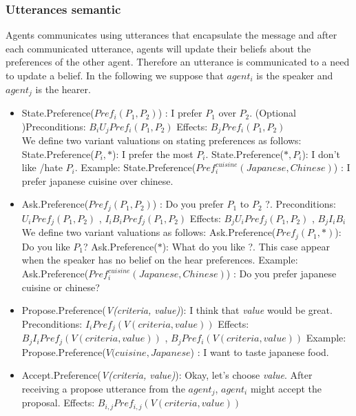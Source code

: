 \documentclass{llncs}
\begin{document}
\subsubsection{Utterances semantic}
Agents communicates using utterances that encapsulate the message and after each communicated utterance, agents will update their beliefs about the preferences of the other agent. Therefore an utterance is communicated to a need to update a belief. In the following we suppose that $agent_{i}$ is the speaker and $agent_{j}$ is the hearer. 
 \begin{itemize}
 \item State.Preference(\textit{$Pref_{i}(P_{1}, P_{2})$}) : I prefer $P_{1}$ over $P_{2}$.
 \subitem (Optional )Preconditions:  $ B_{i} U_{j} Pref_{i}(P_{1}, P_{2})$
 \subitem Effects: $ B_{j} Pref_{i}(P_{1}, P_{2})$
 \\ We define two variant valuations on stating preferences as follows: 
 \subitem State.Preference(\textit{$P_{i}, *$}): I prefer the most $P_{i}$.
 \subitem State.Preference(\textit{$*, P_{i}$}): I don't like /hate $P_{i}$.
\subitem Example: State.Preference(\textit{$Pref_{i}^{cuisine} (Japanese , Chinese)$}) : I prefer japanese cuisine over chinese.
 \item Ask.Preference(\textit{$Pref_{j}(P_{1}, P_{2})$}) : Do you prefer $P_{1}$ to $P_{2}$ ?. 
  \subitem Preconditions:  $ U_{i} Pref_{j}(P_{1}, P_{2})$ ,  $ I_{i} B_{i} Pref_{j}(P_{1}, P_{2})$
  \subitem Effects:  $B_{j} U_{i} Pref_{j}(P_{1}, P_{2})$ ,  $ B_{j} I_{i} B_{i}$
 \\We define two variant valuations as follows: 
 \subitem Ask.Preference(\textit{$Pref_{j}(P_{1}, *)$}): Do you like $P_{1}$?
 \subitem Ask.Preference(\textit{$*$}): What do you like ?. This case appear when the speaker has no belief on the hear preferences. 
 \subitem Example: Ask.Preference(\textit{$Pref_{i}^{cuisine} (Japanese , Chinese)$}) : Do you prefer japanese cuisine or chinese?
 
 \item Propose.Preference(\textit{V(criteria, value)}): I think that \textit{value}  would be great. 
  \subitem Preconditions:  $ I_{i} Pref_{j}(V(criteria, value))$
  \subitem Effects:  $B_{j} I_{i} Pref_{j}(V(criteria, value))$ ,  $ B_{j} Pref_{i}(V(criteria, value))$
   \subitem Example: Propose.Preference(\textit{$V(cuisine,Japanese$}) : I want to taste japanese food.
 \item Accept.Preference(\textit{V(criteria, value)}): Okay, let's choose \textit{value}. After receiving a propose utterance from the $agent_{j}$,  $agent_{i}$ might accept the proposal.
   \subitem Effects:  $B_{i,j} Pref_{i,j}(V(criteria, value))$
   

\end{itemize}
\end{document}
